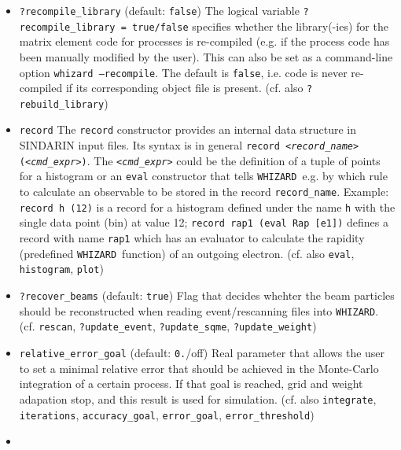 \documentclass[12pt]{book}
\newcommand{\ttt}[1]{\texttt{#1}}
\newcommand{\whizard}{\texttt{WHIZARD}}
\begin{document}
\begin{itemize}
This logical variable, if set \ttt{true}, triggers recreation of the 
phase space file by \whizard\. (cf. also \ttt{?rebuild\_events},
\ttt{?rebuild\_grids}, \ttt{?rebuild\_library})
\item
\ttt{?recompile\_library} \qquad (default: \ttt{false}) \newline
The logical variable \ttt{?recompile\_library = true/false} specifies
whether the library(-ies) for the matrix element code for processes is
re-compiled (e.g. if the process code has been manually modified by
the user). This can also be set as a command-line option \ttt{whizard
  --recompile}. The default is \ttt{false}, i.e. code is never
re-compiled if its corresponding object file is present. (cf. also
\ttt{?rebuild\_library}) 
\item
\ttt{record} \newline
The \ttt{record} constructor provides an internal data structure in
SINDARIN input files. Its syntax is in general \ttt{record
  {\em <record\_name>} ({\em <cmd\_expr>})}. The \ttt{{\em <cmd\_expr>}} could be the
definition of a tuple of points for a histogram or an \ttt{eval}
constructor that tells \whizard\ e.g. by which rule to calculate an
observable to be stored in the record \ttt{record\_name}. Example: 
\ttt{record h (12)} is a record for a histogram defined under the name
\ttt{h} with the single data point (bin) at value 12; \ttt{record rap1
(eval Rap [e1])} defines a record with name \ttt{rap1} which has an
evaluator to calculate the rapidity (predefined \whizard\ function) of
an outgoing electron.
(cf. also \ttt{eval}, \ttt{histogram}, \ttt{plot})
\item
\ttt{?recover\_beams} \qquad (default: \ttt{true}) \newline
Flag that decides whehter the beam particles should be reconstructed
when reading event/rescanning files into \whizard. (cf. \ttt{rescan},
\ttt{?update\_event}, \ttt{?update\_sqme}, \newline 
\ttt{?update\_weight})
\item
\ttt{relative\_error\_goal} \qquad (default: \ttt{0.}/off) \newline
Real parameter that allows the user to set a minimal relative error
that should be achieved in the Monte-Carlo integration of a certain 
process. If that goal is reached, grid and weight adapation stop, and
this result is used for simulation. (cf. also \ttt{integrate},
\ttt{iterations}, \ttt{accuracy\_goal}, \ttt{error\_goal},
\ttt{error\_threshold}) 
\item

\end{itemize}
\end{document}
